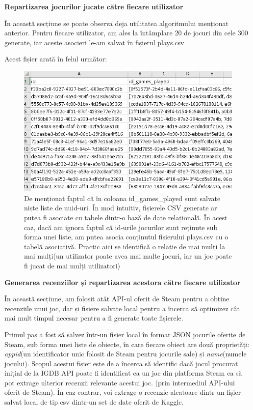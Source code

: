 \documentclass[12pt,a4paper]{report}
\begin{document}
\bigskip
\textbf{Repartizarea jocurilor jucate către fiecare utilizator}
\bigskip

În această secțiune se poate observa deja utilitatea algoritmului menționat anterior. Pentru fiecare utilizator, am ales la întâmplare 20 de jocuri din cele 300 generate, iar aceste asocieri le-am salvat în fișierul plays.csv

Acest fișier arată în felul următor:

\begin{figure}[H]
\centering
\caption{}
\includegraphics[scale = 0.8]{exemplu_12_plays}
\caption*{De menționat faptul că în coloana id\_games\_played sunt salvate niște liste de uuid-uri. În mod intuitiv, fișierele CSV generate ar putea fi asociate cu tabele dintr-o bază de date relațională. În acest caz, dacă am ignora faptul că id-urile jocurilor sunt reținute sub forma unei liste, am putea asocia conținutul fișierului plays.csv cu o tabelă asociativă. Practic aici se identifică o relație de mai mulți la mai mulți(un utilizator poate avea mai multe jocuri, iar un joc poate fi jucat de mai mulți utilizatori) }
\end{figure}

\bigskip
\textbf{Generarea recenziilor și repartizarea acestora către fiecare utilizator}
\bigskip

În această secțiune, am folosit atât API-ul oferit de Steam pentru a obține recenziile unui joc, dar și fișiere salvate local pentru a încerca să optimizez cât mai mult timpul necesar pentru a fi generate toate fișierele.

Primul pas a fost să salvez într-un fișier local în format JSON jocurile oferite de Steam, sub forma unei liste de obiecte, în care fiecare obiect are două proprietăți:  \emph{appid}(un identificator unic folosit de Steam pentru jocurile sale) și \emph{name}(numele jocului). Scopul acestui fișier este de a încerca să identific dacă jocul procurat inițial de la IGDB API poate fi identificat ca un joc din platforma Steam ca să pot extrage ulterior recenzii relevante acestui joc. (prin intermediul API-ului oferit de Steam). În caz contrar, voi extrage o recenzie aleatoare dintr-un fișier salvat local de tip csv dintr-un set de date oferit de Kaggle. \cite{17}
\end{document}

